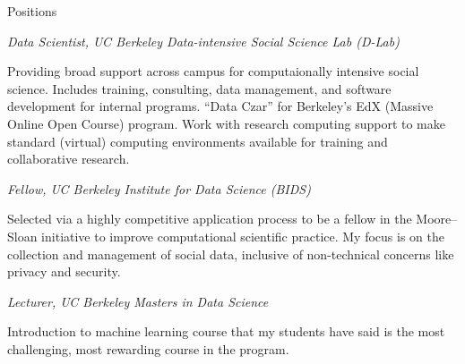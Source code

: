 \begin{rubric}{Positions}

\entry*[2013--present] \emph{Data Scientist, UC Berkeley Data-intensive Social
    Science Lab (D-Lab)}
\par Providing broad support across campus for computaionally intensive social
science. Includes training, consulting, data management, and software
development for internal programs. “Data Czar” for Berkeley's EdX (Massive
Online Open Course) program. Work with research computing support to make
standard (virtual) computing environments available for training and
collaborative research.

\entry*[2014--present] \emph{Fellow, UC Berkeley Institute for Data Science
    (BIDS)}
\par Selected via a highly competitive application process to be a fellow in the
Moore--Sloan initiative to improve computational scientific practice. My focus
is on the collection and management of social data, inclusive of non-technical
concerns like privacy and security.

\entry*[2014] \emph{Lecturer, UC Berkeley Masters in Data Science}
\par Introduction to machine learning course that my students have said is the
most challenging, most rewarding course in the program.

\end{rubric}
